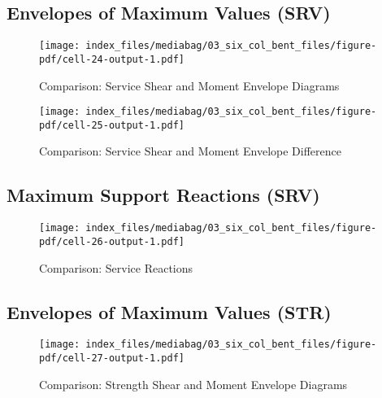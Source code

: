 \documentclass[
  letterpaper,
  DIV=11,
  numbers=noendperiod]{scrreprt}
\begin{document}
\subsection{Envelopes of Maximum Values
(SRV)}\label{envelopes-of-maximum-values-srv-5}

\begin{figure}[H]

{\centering \texttt{[image: index\_files/mediabag/03\_six\_col\_bent\_files/figure-pdf/cell-24-output-1.pdf]}

}

\caption{Comparison: Service Shear and Moment Envelope Diagrams}

\end{figure}%

\begin{figure}[H]

{\centering \texttt{[image: index\_files/mediabag/03\_six\_col\_bent\_files/figure-pdf/cell-25-output-1.pdf]}

}

\caption{Comparison: Service Shear and Moment Envelope Difference}

\end{figure}%

\subsection{Maximum Support Reactions
(SRV)}\label{maximum-support-reactions-srv-5}

\begin{figure}[H]

{\centering \texttt{[image: index\_files/mediabag/03\_six\_col\_bent\_files/figure-pdf/cell-26-output-1.pdf]}

}

\caption{Comparison: Service Reactions}

\end{figure}%

\subsection{Envelopes of Maximum Values
(STR)}\label{envelopes-of-maximum-values-str-5}

\begin{figure}[H]

{\centering \texttt{[image: index\_files/mediabag/03\_six\_col\_bent\_files/figure-pdf/cell-27-output-1.pdf]}

}

\caption{Comparison: Strength Shear and Moment Envelope Diagrams}

\end{figure}%
\end{document}
